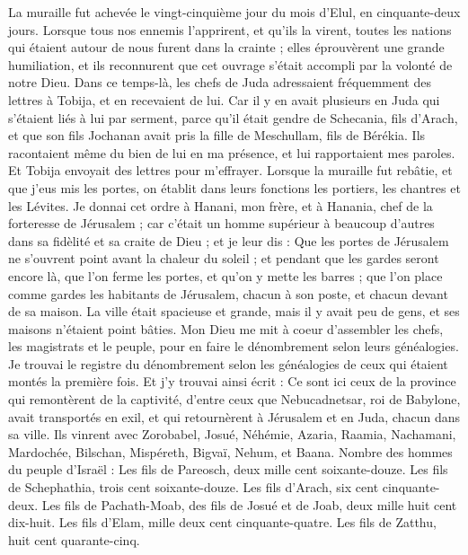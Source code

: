 \begin{multicols}{2}
La muraille fut achevée le vingt-cinquième jour du mois d'Elul, en cinquante-deux jours.
Lorsque tous nos ennemis l'apprirent, et qu’ils la virent, toutes les nations qui étaient autour de nous furent dans la crainte ; elles éprouvèrent une grande humiliation, et ils reconnurent que cet ouvrage s'était accompli par la volonté de notre Dieu.
Dans ce temps-là, les chefs de Juda adressaient fréquemment des lettres à Tobija, et en recevaient de lui.
Car il y en avait plusieurs en Juda qui s'étaient liés à lui par serment, parce qu'il était gendre de Schecania, fils d'Arach, et que son fils Jochanan avait pris la fille de Meschullam, fils de Bérékia.
Ils racontaient même du bien de lui en ma présence, et lui rapportaient mes paroles. Et Tobija envoyait des lettres pour m'effrayer.
\VerseOne{}Lorsque la muraille fut rebâtie, et que j'eus mis les portes, on établit dans leurs fonctions les portiers, les chantres et les Lévites.
Je donnai cet ordre à Hanani, mon frère, et à Hanania, chef de la forteresse de Jérusalem ; car c'était un homme supérieur à beaucoup d'autres dans sa fidèlité et sa craite de Dieu ;
et je leur dis : Que les portes de Jérusalem ne s'ouvrent point avant la chaleur du soleil ; et pendant que les gardes seront encore là, que l'on ferme les portes, et qu'on y mette les barres ; que l'on place comme gardes les habitants de Jérusalem, chacun à son poste, et chacun devant de sa maison.
La ville était spacieuse et grande, mais il y avait peu de gens, et ses maisons n'étaient point bâties.
Mon Dieu me mit à coeur d'assembler les chefs, les magistrats et le peuple, pour en faire le dénombrement selon leurs généalogies. Je trouvai le registre du dénombrement selon les généalogies de ceux qui étaient montés la première fois. Et j'y trouvai ainsi écrit :
Ce sont ici ceux de la province qui remontèrent de la captivité, d'entre ceux que Nebucadnetsar, roi de Babylone, avait transportés en exil, et qui retournèrent à Jérusalem et en Juda, chacun dans sa ville.
Ils vinrent avec Zorobabel, Josué, Néhémie, Azaria, Raamia, Nachamani, Mardochée, Bilschan, Mispéreth, Bigvaï, Nehum, et Baana. Nombre des hommes du peuple d'Israël :
Les fils de Pareosch, deux mille cent soixante-douze.
Les fils de Schephathia, trois cent soixante-douze.
Les fils d'Arach, six cent cinquante-deux.
Les fils de Pachath-Moab, des fils de Josué et de Joab, deux mille huit cent dix-huit.
Les fils d’Elam, mille deux cent cinquante-quatre.
Les fils de Zatthu, huit cent quarante-cinq.

\end{multicols}
